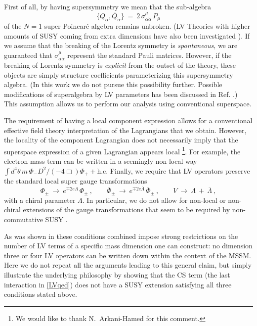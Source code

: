 \documentclass[12pt]{revtex4}
\begin{document}
First of all,
by having supersymmetry we mean that the sub-algebra 
%
\begin{equation}
\{ Q_\alpha, \overline{Q}_{\dot\alpha} \} ~=~ 
2\, \sigma^\mu_{\alpha\dot{\alpha}} \, P_\mu
\end{equation}
%
of the $N=1$ super Poincar\'e algebra remains unbroken. (LV Theories with
higher amounts of SUSY coming from extra dimensions have also
been investigated  \cite{Ney:2004tn,Ney:2005gb,Ney:2005wc}).
If we assume that the breaking of the Lorentz symmetry is 
{\em spontaneous}, we are guaranteed that
$\sigma^\mu_{\alpha\dot{\alpha}}$ represent the standard Pauli
matrices. However, if the breaking of Lorentz symmetry is {\em
explicit} from the outset of the theory, these objects are simply 
structure coefficients parameterizing this supersymmetry algebra. (In
this work we do not pursue this possibility further. Possible
modifications of superalgebra by LV parameters has been discussed in
Ref. \cite{Berger:,Berger:2003ay}.) This assumption allows us to perform our
analysis using conventional superspace.  


The requirement of having a local component expression allows for a
conventional effective field theory interpretation of the Lagrangians that
we obtain. However, the locality of the component Lagrangian
does not necessarily imply that the superspace
expression of a given Lagrangian appears local 
\footnote{We would like to thank N.\ Arkani-Hamed for this comment.}. 
For example, the electron mass term can be written in a seemingly
non-local way 
%
\(
\int d^4 \theta\, m \, \Phi_- D^2/(- 4\Box) \Phi_+ + \text{h.c.}
\)
%
Finally, we require that LV operators preserve the standard local
super gauge transformations  
%
\begin{equation}
\Phi_\pm ~\rightarrow~ e^{\mp 2 e \Lambda} \, \Phi_\pm~, 
\qquad 
\overline{\Phi}_\pm ~\rightarrow~ e^{\mp 2 e \overline{\Lambda}} \, 
\overline{\Phi}_\pm~, 
\qquad 
V ~\rightarrow~ \Lambda ~+~ \overline{\Lambda}~, 
\label{Gauge}
\end{equation} 
%
with a chiral parameter $\Lambda$. In particular, we do not allow for
non-local or non-chiral extensions of the gauge transformations that
seem to be required by non-commutative SUSY
\cite{Putz:2002ib,Mikulovic:2003sq}.  


As was shown in \cite{GrootNibbelink:2004za} these conditions 
combined impose strong restrictions on the number of LV terms of
a specific mass dimension one can construct: no dimension three or four
LV operators can be written down within the context of the MSSM. 
Here we do not repeat all the arguments leading to this general claim,
but simply illustrate the underlying philosophy by showing that the CS
term (the last interaction in \eqref{LVqed}) does not have a SUSY
extension satisfying all three conditions stated above. 
\end{document}
